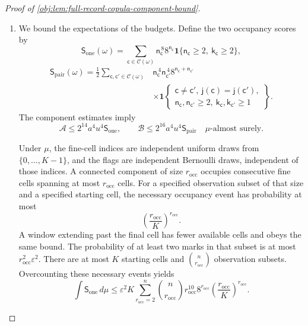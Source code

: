 \documentclass[11pt]{article}
\begin{document}
\begin{proof}[Proof of \cref{obj:lem:full-record-copula-component-bound}]
\begin{enumerate}
\item
We bound the expectations of the budgets. Define the two occupancy scores by
\[
\mathsf S_{\mathrm{one}}(\omega)
 =
 \sum_{\mathsf c\in\mathscr C(\omega)}
 \mathsf n_{\mathsf c}^{\,8}8^{\mathsf n_{\mathsf c}}
 \mathbf1\{\mathsf n_{\mathsf c}\ge2,\
           \mathsf k_{\mathsf c}\ge2\},
\]
\[
\begin{aligned}
\mathsf S_{\mathrm{pair}}(\omega)
 =\frac12
 \sum_{\mathsf c,\mathsf c'\in\mathscr C(\omega)}
 &\mathsf n_{\mathsf c}^{\,4}\mathsf n_{\mathsf c'}^{\,4}
   8^{\mathsf n_{\mathsf c}+\mathsf n_{\mathsf c'}}\\
 &\times
 \mathbf1\left\{
 \begin{array}{c}
 \mathsf c\ne\mathsf c',\
 \mathsf j(\mathsf c)=\mathsf j(\mathsf c'),\\
 \mathsf n_{\mathsf c},\mathsf n_{\mathsf c'}\ge2,\
 \mathsf k_{\mathsf c},\mathsf k_{\mathsf c'}\ge1
 \end{array}\right\}.
\end{aligned}
\]
The component estimates imply
\[
\mathcal A\le2^{14}a^4u^4\mathsf S_{\mathrm{one}},
\qquad
\mathcal B\le2^{16}a^4u^4\mathsf S_{\mathrm{pair}}
\quad\mu\text{-almost surely}.
\]

Under \(\mu\), the fine-cell indices are independent uniform draws from
\(\{0,\ldots,K-1\}\), and the flags are independent Bernoulli draws, independent of those indices. A connected component of size \(r_{\mathrm{occ}}\) occupies consecutive fine cells spanning at most \(r_{\mathrm{occ}}\) cells. For a specified observation subset of that size and a specified starting cell, the necessary occupancy event has probability at most
\[
\left(\frac{r_{\mathrm{occ}}}{K}\right)^{r_{\mathrm{occ}}}.
\]
A window extending past the final cell has fewer available cells and obeys the same bound. The probability of at least two marks in that subset is at most
\(r_{\mathrm{occ}}^2\varepsilon^2\). There are at most \(K\) starting cells and
\(\binom n{r_{\mathrm{occ}}}\) observation subsets. Overcounting these necessary events yields
\[
\int\mathsf S_{\mathrm{one}}\,d\mu
 \le
 \varepsilon^2K
 \sum_{r_{\mathrm{occ}}=2}^{n}
 \binom n{r_{\mathrm{occ}}}
 r_{\mathrm{occ}}^{10}8^{r_{\mathrm{occ}}}
 \left(\frac{r_{\mathrm{occ}}}{K}\right)^{r_{\mathrm{occ}}}.
\]


\end{enumerate}
\end{proof}
\end{document}
